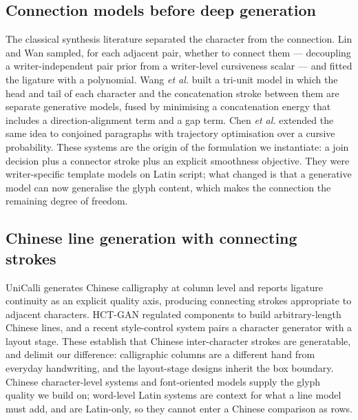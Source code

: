 \documentclass[conference]{IEEEtran}
\begin{document}
\subsection{Connection models before deep generation}
The classical synthesis literature separated the character from the connection. Lin and Wan
\cite{lin2007} sampled, for each adjacent pair, whether to connect them --- decoupling a
writer-independent pair prior from a writer-level cursiveness scalar --- and fitted the
ligature with a polynomial. Wang \emph{et al.} \cite{wang2005} built a tri-unit model in which
the head and tail of each character and the concatenation stroke between them are separate
generative models, fused by minimising a concatenation energy that includes a
direction-alignment term and a gap term. Chen \emph{et al.} \cite{chen2015} extended the same
idea to conjoined paragraphs with trajectory optimisation over a cursive probability. These
systems are the origin of the formulation we instantiate: a join decision plus a connector
stroke plus an explicit smoothness objective. They were writer-specific template models on
Latin script; what changed is that a generative model can now generalise the glyph content,
which makes the connection the remaining degree of freedom.

\subsection{Chinese line generation with connecting strokes}
UniCalli \cite{unicalli} generates Chinese calligraphy at column level and reports ligature
continuity as an explicit quality axis, producing connecting strokes appropriate to adjacent
characters. HCT-GAN \cite{hct_gan} regulated components to build arbitrary-length Chinese
lines, and a recent style-control system \cite{yao2025} pairs a character generator with a
layout stage. These establish that Chinese inter-character strokes are generatable, and
delimit our difference: calligraphic columns are a different hand from everyday handwriting,
and the layout-stage designs inherit the box boundary. Chinese character-level systems
\cite{metascript,sdt,rcgan,hisac,diffwriter} and font-oriented models
\cite{dp_font,scfont,stroke2font,lvgh,calligan,cffont,dgfont,difffont,fontdiffuser,lffont}
supply the glyph quality we build on; word-level Latin systems
\cite{ganwriting,hwt,vatr,vatr_pp,diffusionpen,one_dm,wordstylist,emuru,scriptvit,dsd,hi_gan}
are context for what a line model must add, and are Latin-only, so they cannot enter a
Chinese comparison as rows.
\end{document}
